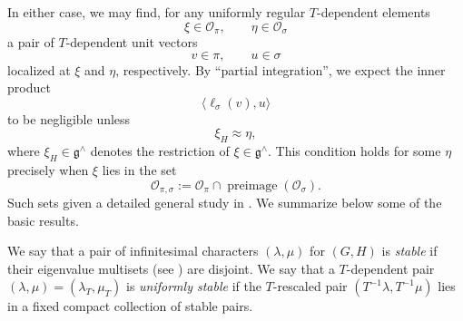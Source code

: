 \documentclass[reqno]{amsart} 
\numberwithin{equation}{section}
\begin{document}
In either case, we may find, for any uniformly regular $T$-dependent elements
\begin{equation*}
  \xi \in \mathcal{O}_\pi, \qquad  \eta \in \mathcal{O}_\sigma
\end{equation*}
a pair of $T$-dependent unit vectors
\begin{equation*}
  v \in \pi, \qquad u \in \sigma 
\end{equation*}
localized at $\xi$ and $\eta$, respectively.  By ``partial integration'', we expect the inner product
\begin{equation*}
  \langle \ell_\sigma(v), u \rangle
\end{equation*}
to be negligible unless
\begin{equation*}
  \xi_H \approx \eta,
\end{equation*}
where $\xi_H \in \mathfrak{g}^\wedge$ denotes the restriction of $\xi \in \mathfrak{g}^\wedge$.  This condition holds for some $\eta$ precisely when $\xi$ lies in the set
\begin{equation*}
  \mathcal{O}_{\pi,\sigma} := \mathcal{O}_\pi \cap \operatorname{preimage}(\mathcal{O}_\sigma).
\end{equation*}
Such sets given a detailed general study in \cite{nelson-venkatesh-1}.  We summarize below some of the basic results.

\begin{definition}
  We say that a pair of infinitesimal characters $(\lambda,\mu)$ for $(G,H)$ is \emph{stable} if their eigenvalue multisets (see \cite[\S13.4.1]{nelson-venkatesh-1}) are disjoint.  We say that a $T$-dependent pair $(\lambda,\mu) = (\lambda_T, \mu_T)$ is \emph{uniformly stable} if the $T$-rescaled pair $(T^{-1} \lambda, T^{-1} \mu)$ lies in a fixed compact collection of stable pairs.
\end{definition}
\end{document}
